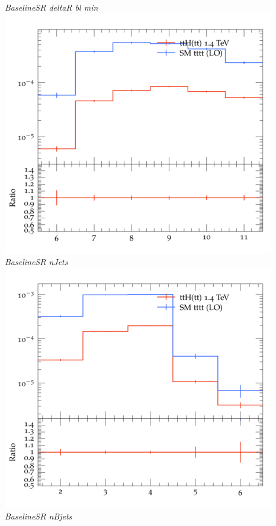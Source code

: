 \documentclass{beamer}
\begin{document}
\begin{frame}
\begin{columns}
\textit{\small BaselineSR deltaR bl min}
\includegraphics[width=\textwidth]{../plots/ttH_1400/tttt_ttH_1LOS/BaselineSR_nJets.png}\\
\textit{\small BaselineSR nJets}
\includegraphics[width=\textwidth]{../plots/ttH_1400/tttt_ttH_1LOS/BaselineSR_nBjets.png}\\
\textit{\small BaselineSR nBjets}
\end{columns}
\end{frame}
\end{document}
